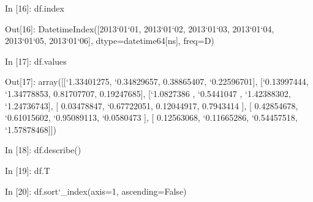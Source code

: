 \documentclass[letterpaper,10pt,english]{sphinxmanual}
\def\PYGZus{\char`\_}
\def\PYGZhy{\char`\-}
\def\PYGZsq{\char`\'}
\renewcommand\PYGZsq{\textquotesingle}
\begin{document}
\begin{OriginalVerbatim}[commandchars=\\\{\}]
\textcolor{nbsphinxin}{In [16]: }df.index
\end{OriginalVerbatim}

\begin{OriginalVerbatim}[commandchars=\\\{\}]
\textcolor{nbsphinxout}{Out[16]: }DatetimeIndex([\PYGZsq{}2013\PYGZhy{}01\PYGZhy{}01\PYGZsq{}, \PYGZsq{}2013\PYGZhy{}01\PYGZhy{}02\PYGZsq{}, \PYGZsq{}2013\PYGZhy{}01\PYGZhy{}03\PYGZsq{}, \PYGZsq{}2013\PYGZhy{}01\PYGZhy{}04\PYGZsq{},
                        \PYGZsq{}2013\PYGZhy{}01\PYGZhy{}05\PYGZsq{}, \PYGZsq{}2013\PYGZhy{}01\PYGZhy{}06\PYGZsq{}],
                       dtype=\PYGZsq{}datetime64[ns]\PYGZsq{}, freq=\PYGZsq{}D\PYGZsq{})
\end{OriginalVerbatim}

\begin{OriginalVerbatim}[commandchars=\\\{\}]
\textcolor{nbsphinxin}{In [17]: }df.values
\end{OriginalVerbatim}

\begin{OriginalVerbatim}[commandchars=\\\{\}]
\textcolor{nbsphinxout}{Out[17]: }array([[\PYGZhy{}1.33401275, \PYGZhy{}0.34829657,  0.38865407, \PYGZhy{}0.22596701],
                [\PYGZhy{}0.13997444, \PYGZhy{}1.34778853,  0.81707707,  0.19247685],
                [\PYGZhy{}1.0827386 , \PYGZhy{}0.5441047 , \PYGZhy{}1.42388302, \PYGZhy{}1.24736743],
                [ 0.03478847, \PYGZhy{}0.67722051,  0.12044917,  0.7943414 ],
                [ 0.42854678, \PYGZhy{}0.61015602, \PYGZhy{}0.95089113, \PYGZhy{}0.0580473 ],
                [ 0.12563068, \PYGZhy{}0.11665286, \PYGZhy{}0.54457518, \PYGZhy{}1.57878468]])
\end{OriginalVerbatim}

\begin{OriginalVerbatim}[commandchars=\\\{\}]
\textcolor{nbsphinxin}{In [18]: }df.describe()
\end{OriginalVerbatim}

\begin{OriginalVerbatim}[commandchars=\\\{\}]
\textcolor{nbsphinxin}{In [19]: }df.T
\end{OriginalVerbatim}

\begin{OriginalVerbatim}[commandchars=\\\{\}]
\textcolor{nbsphinxin}{In [20]: }df.sort\PYGZus{}index(axis=1, ascending=False)
\end{OriginalVerbatim}
\end{document}
